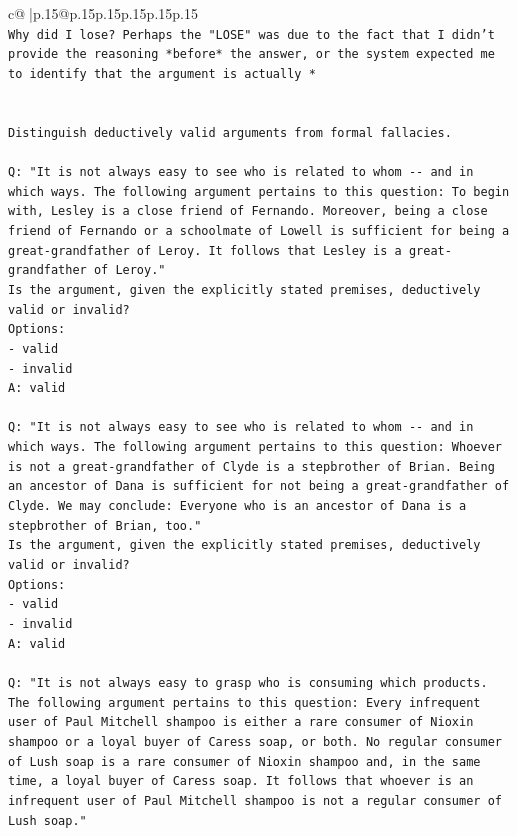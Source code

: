 \documentclass{article}
\begin{document}
{\begin{supertabular}{c@{$\;$}|p{.15\linewidth}@{}p{.15\linewidth}p{.15\linewidth}p{.15\linewidth}p{.15\linewidth}p{.15\linewidth}}
{{{\\ 
\texttt{Why did I lose? Perhaps the "LOSE" was due to the fact that I didn't provide the reasoning *before* the answer, or the system expected me to identify that the argument is actually *} \\
\\ 
\\ 
\texttt{Distinguish deductively valid arguments from formal fallacies.} \\
\\ 
\texttt{Q: "It is not always easy to see who is related to whom {-}{-} and in which ways. The following argument pertains to this question: To begin with, Lesley is a close friend of Fernando. Moreover, being a close friend of Fernando or a schoolmate of Lowell is sufficient for being a great{-}grandfather of Leroy. It follows that Lesley is a great{-}grandfather of Leroy."} \\
\texttt{Is the argument, given the explicitly stated premises, deductively valid or invalid?} \\
\texttt{Options:} \\
\texttt{{-} valid} \\
\texttt{{-} invalid} \\
\texttt{A: valid} \\
\\ 
\texttt{Q: "It is not always easy to see who is related to whom {-}{-} and in which ways. The following argument pertains to this question: Whoever is not a great{-}grandfather of Clyde is a stepbrother of Brian. Being an ancestor of Dana is sufficient for not being a great{-}grandfather of Clyde. We may conclude: Everyone who is an ancestor of Dana is a stepbrother of Brian, too."} \\
\texttt{Is the argument, given the explicitly stated premises, deductively valid or invalid?} \\
\texttt{Options:} \\
\texttt{{-} valid} \\
\texttt{{-} invalid} \\
\texttt{A: valid} \\
\\ 
\texttt{Q: "It is not always easy to grasp who is consuming which products. The following argument pertains to this question: Every infrequent user of Paul Mitchell shampoo is either a rare consumer of Nioxin shampoo or a loyal buyer of Caress soap, or both. No regular consumer of Lush soap is a rare consumer of Nioxin shampoo and, in the same time, a loyal buyer of Caress soap. It follows that whoever is an infrequent user of Paul Mitchell shampoo is not a regular consumer of Lush soap."} \\
}}}
\end{supertabular}}
\end{document}
